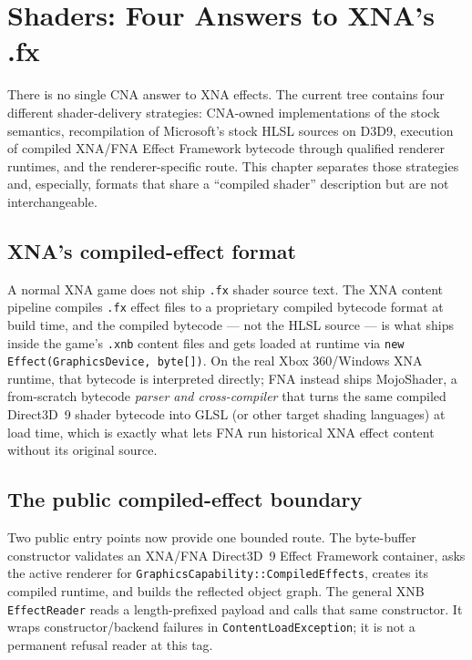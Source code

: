 \chapter{Shaders: Four Answers to XNA's .fx}
\label{ch:shaders-four-answers}
\label{ch:shader-fx-gap}

There is no single CNA answer to XNA effects. The current tree contains four different
shader-delivery strategies: CNA-owned implementations of the stock semantics, recompilation
of Microsoft's stock HLSL sources on D3D9, execution of compiled XNA/FNA Effect Framework
bytecode through qualified renderer runtimes, and the renderer-specific 
route. This chapter separates those strategies and, especially, formats that share a ``compiled
shader'' description but are not interchangeable.



\section{XNA's compiled-effect format}

A normal XNA game does not ship \texttt{.fx} shader source text. The XNA content pipeline
compiles \texttt{.fx} effect files to a proprietary compiled bytecode format at build time,
and the compiled bytecode --- not the HLSL source --- is what ships inside the game's
\texttt{.xnb} content files and gets loaded at runtime via
\texttt{new Effect(GraphicsDevice, byte[])}. On the real Xbox 360/Windows XNA runtime, that
bytecode is interpreted directly; FNA instead ships MojoShader, a from-scratch bytecode
\emph{parser and cross-compiler} that turns the same compiled Direct3D~9 shader bytecode into
GLSL (or other target shading languages) at load time, which is exactly what lets FNA run
historical XNA effect content without its original source.

\section{The public compiled-effect boundary}

Two public entry points now provide one bounded route. The  byte-buffer
constructor validates an XNA/FNA Direct3D~9 Effect Framework container, asks the active renderer
for \texttt{GraphicsCapability::CompiledEffects}, creates its compiled runtime, and builds the
reflected object graph. The general XNB \texttt{EffectReader} reads a length-prefixed payload and
calls that same constructor. It wraps constructor/backend failures in
\texttt{ContentLoadException}; it is not a permanent refusal reader at this tag.

